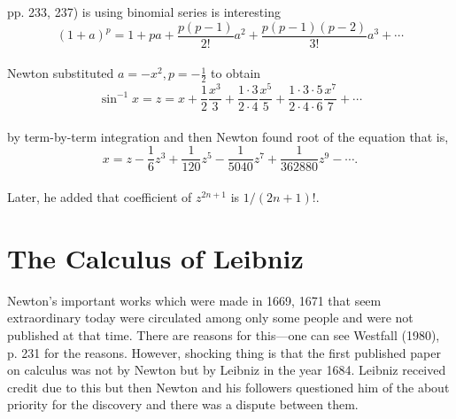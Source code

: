 \documentclass[a4paper,reqno,11pt]{amsart}
\theoremstyle{plain}%
\begin{document}
pp. 233, 237) is using binomial series is interesting\\
$$(1+a)^p =  1 + pa + \frac{p(p-1)}{2!}a^2 + \frac{p(p-1)(p-2)}{3!}a^3 + \cdots$$\\
Newton substituted $a = -x^2, p = -\frac{1}{2} $ to obtain\\ 
$$ \sin^{-1}x = z = x + \frac{1}{2}\frac{x^3}{3} + \frac{1\cdot3}{2\cdot4}\frac{x^5}{5} + \frac{1\cdot3\cdot5}{2\cdot4\cdot6}\frac{x^7}{7} + \cdots$$\\
by term-by-term integration and then Newton found root of the equation that is,\\
$$x = z - \frac{1}{6}z^3 + \frac{1}{120}z^5 - \frac{1}{5040}z^7 + \frac{1}{362880}z^9 - \cdots.$$\\
Later, he added that coefficient of $z^{2n+1}$ is $1/(2n+1)!.$
\section{The Calculus of Leibniz}
Newton’s important works which were made in 1669, 1671 that seem extraordinary today were circulated among only some people and were not published
at that time. There are reasons for this—one can see Westfall (1980), p. 231 for the reasons. However, shocking thing is that the first published paper on calculus was not by Newton but
by Leibniz in the year 1684. Leibniz received credit due to this but then Newton and his followers questioned him of the about priority for the discovery and there was a dispute between them.\\
\end{document}
